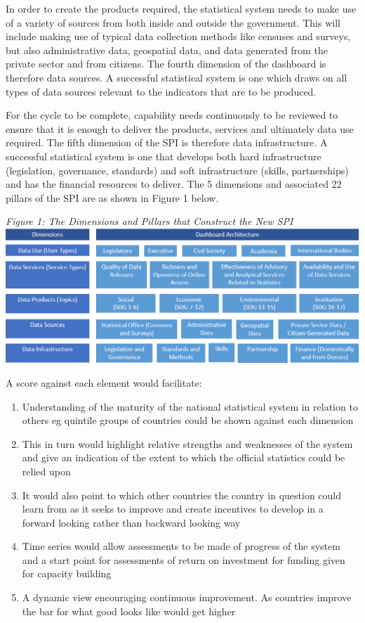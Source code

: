 \documentclass[
]{article}
\providecommand{\tightlist}{%
  \setlength{\itemsep}{0pt}\setlength{\parskip}{0pt}}
\begin{document}
In order to create the products required, the statistical system needs to make use of a variety of sources from both inside and outside the government. This will include making use of typical data collection methods like censuses and surveys, but also administrative data, geospatial data, and data generated from the private sector and from citizens. The fourth dimension of the dashboard is therefore data sources. A successful statistical system is one which draws on all types of data sources relevant to the indicators that are to be produced.

For the cycle to be complete, capability needs continuously to be reviewed to ensure that it is enough to deliver the products, services and ultimately data use required. The fifth dimension of the SPI is therefore data infrastructure. A successful statistical system is one that develops both hard infrastructure (legislation, governance, standards) and soft infrastructure (skills, partnerships) and has the financial resources to deliver.
The 5 dimensions and associated 22 pillars of the SPI are as shown in Figure 1 below.

\emph{Figure 1: The Dimensions and Pillars that Construct the New SPI}
\includegraphics{SPI_dashboard.png}

A score against each element would facilitate:

\begin{enumerate}
\def\labelenumi{\arabic{enumi}.}
\tightlist
\item
  Understanding of the maturity of the national statistical system in relation to others eg quintile groups of countries could be shown against each dimension\\
\item
  This in turn would highlight relative strengths and weaknesses of the system and give an indication of the extent to which the official statistics could be relied upon\\
\item
  It would also point to which other countries the country in question could learn from as it seeks to improve and create incentives to develop in a forward looking rather than backward looking way\\
\item
  Time series would allow assessments to be made of progress of the system and a start point for assessments of return on investment for funding given for capacity building\\
\item
  A dynamic view encouraging continuous improvement. As countries improve the bar for what good looks like would get higher
\end{enumerate}
\end{document}
